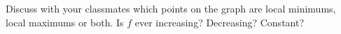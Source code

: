 {Discuss with your classmates which points on the graph are local minimums, local maximums or both.  Is $f$ ever increasing?  Decreasing?  Constant?}
{}